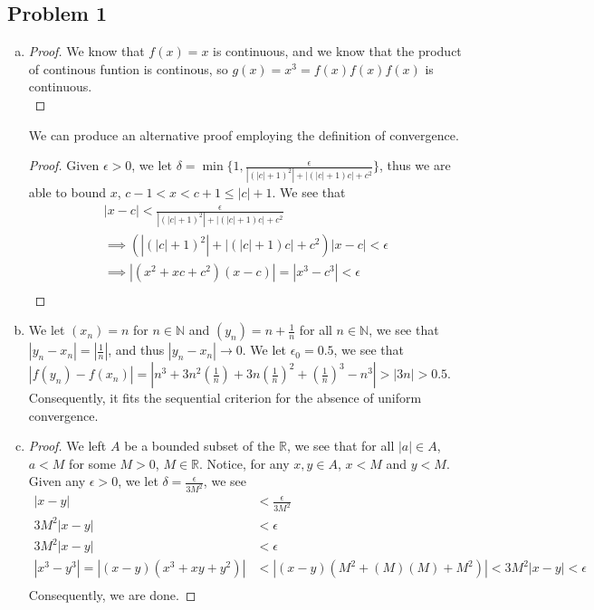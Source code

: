 \documentclass[12pt]{article}
\begin{document}
\subsection*{Problem 1}
\begin{enumerate}[a).]
    \item {
        \begin{proof}
        We know that $f(x) = x$ is continuous, and we know that the product of continous funtion is continous, 
        so $g(x) = x^3 = f(x)f(x)f(x)$ is continuous. \\
        \end{proof}
        We can produce an alternative proof employing the definition of convergence.  
        \begin{proof}
            Given $\epsilon > 0$, we let $\delta = \min\{ 1, \frac{\epsilon}{|(|c| + 1)^2| + |(|c| + 1)c| + c^2}\}$, thus we are able to bound $x$, $c-1 < x < c + 1 \le |c| + 1 $.
            We see that 
            \begin{align*}
                |x-c| < \frac{\epsilon}{|(|c| + 1)^2| + |(|c| + 1)c| + c^2} \\
                \implies ({|(|c| + 1)^2| + |(|c| + 1)c| + c^2})|x-c| < \epsilon \\
                \implies |(x^2 + xc + c^2)(x-c)| = |x^3 - c^3| < \epsilon \\
            \end{align*}
        \end{proof}
    }
    \item {
        We let $(x_n) = n$ for $n \in \mathbb{N}$ and $(y_n) = n + \frac{1}{n}$ for all $n \in \mathbb{N}$, we see that $|y_n - x_n| = |\frac{1}{n}|$, and thus $|y_n - x_n| \rightarrow 0$. 
        We let $\epsilon_0 = 0.5$, we see that $|f(y_n) - f(x_n)| = |n^3 + 3n^2(\frac{1}{n}) + 3n(\frac{1}{n})^2 + (\frac{1}{n})^3 - n^3| > |3n| > 0.5$. 
        Consequently, it fits the sequential criterion for the absence of uniform convergence. 
    }
    \item {
        \begin{proof}
        We left $A$ be a bounded subset of the $\mathbb{R}$, we see that for all $ |a| \in A$, $a < M$  for some $M >0$, $M \in \mathbb{R}$. 
        Notice, for any $x, y \in A$, $x < M$ and $y < M$. 
        Given any $\epsilon > 0$, we let $\delta = \frac{\epsilon}{3M^2}$, we see
        \begin{align*}
            |x-y| &< \frac{\epsilon}{3M^2} \\
            3M^2|x-y| &< \epsilon \\
            3M^2|x-y| &< \epsilon \\
            |x^3 - y^3|= |(x-y)(x^3 + xy + y^2)|&<|(x-y) (M^2 + (M)(M) + M^2)| < 3M^2|x-y| < \epsilon \\
        \end{align*}
        Consequently, we are done. 
        \end{proof}
    }
\end{enumerate}
\end{document}
